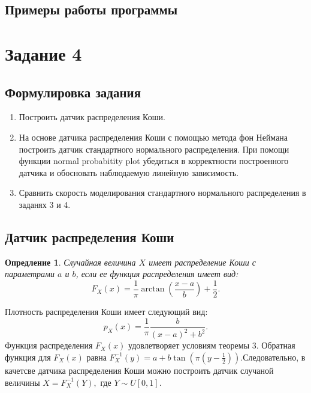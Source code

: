 \documentclass[11pt]{article}
\newtheorem{definition}{Опредление}
\numberwithin{equation}{section}
\begin{document}
\subsection{ Примеры работы программы}





\section{Задание 4}
\subsection{Формулировка задания}
\begin{enumerate}
  \item Построить датчик распределения Коши.
  \item На основе датчика распределения Коши с помощью метода фон Неймана построить датчик стандартного нормального распределения. При помощи функции normal probabitity plot убедиться в корректности построенного датчика и обосновать наблюдаемую линейную зависимость.
  \item Сравнить скорость моделирования стандартного нормального распределения в заданях 3 и 4.
\end{enumerate}
\subsection{Датчик распределения Коши}
\begin{definition}
  Случайная величина $X$ имеет распределение Коши с параметрами $a$ и $b$, если ее функция распределения имеет вид:
  $$F_{X}(x) = \frac{1}{\pi}\arctan (\frac{x-a}{b})+\frac{1}{2}.$$
\end{definition}
Плотность распределения Коши имеет следующий вид:
$$ p_X(x) = \frac{1}{\pi} \frac{b}{(x-a)^2+b^2}.$$
Функция распределения $F_X(x)$ удовлетворяет условиям теоремы 3. Обратная функция для $F_X(x)$ равна $F_X^{-1}(y) = a+b\tan(\pi(y-\frac{1}{2})).$Следовательно, в качетсве датчика распределения Коши можно построить датчик случаной величины $X = F_X^{-1}(Y),$ 
где $Y \sim U[0,1].$
\end{document}
